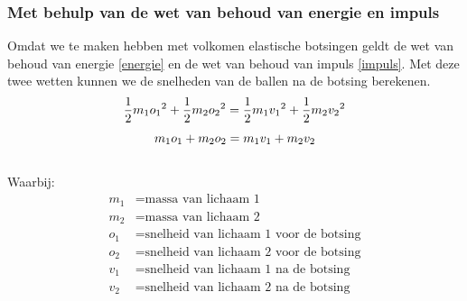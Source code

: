 \documentclass[12pt,a4paper]{article}
\begin{document}
	\subsubsection{Met behulp van de wet van behoud van energie en impuls}
	Omdat we te maken hebben met volkomen elastische botsingen geldt de wet van behoud van energie \eqref{energie} en de wet van behoud van impuls \eqref{impuls}. Met deze twee wetten kunnen we de snelheden van de ballen na de botsing berekenen.
	\begin{equation}
		\label{energie}
		\frac{1}{2} m_1 {o_1}^2 + \frac{1}{2} m_2 {o_2}^2 = \frac{1}{2} m_1{v_1}^2 + \frac{1}{2}m_2 {v_2}^2\\
	\end{equation}
	\begin{equation}
		\label{impuls}
		m_1 o_1 + m_2 o_2 =  m_1 v_1 + m_2 v_2\\
	\end{equation}
	\\Waarbij:
	\begin{equation}
		\begin{aligned}
			m_1 &= \text{massa van lichaam 1}\\
			m_2 &= \text{massa van lichaam 2}\\
			o_1 &= \text{snelheid van lichaam 1 voor de botsing}\\
			o_2 &= \text{snelheid van lichaam 2 voor de botsing}\\
			v_1 &= \text{snelheid van lichaam 1 na de botsing}\\
			v_2 &= \text{snelheid van lichaam 2 na de botsing}\\
		\end{aligned}
	\end{equation}
\end{document}
